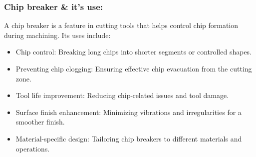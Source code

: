 \documentclass{article}
\begin{document}
\subsubsection*{Chip breaker \& it's use:}
A chip breaker is a feature in cutting tools that helps control chip formation during machining. Its uses include:
\begin{itemize}
  \item Chip control: Breaking long chips into shorter segments or controlled shapes.
  \item Preventing chip clogging: Ensuring effective chip evacuation from the cutting zone.
  \item Tool life improvement: Reducing chip-related issues and tool damage.
  \item Surface finish enhancement: Minimizing vibrations and irregularities for a smoother finish.
  \item Material-specific design: Tailoring chip breakers to different materials and operations.
\end{itemize}
\end{document}
